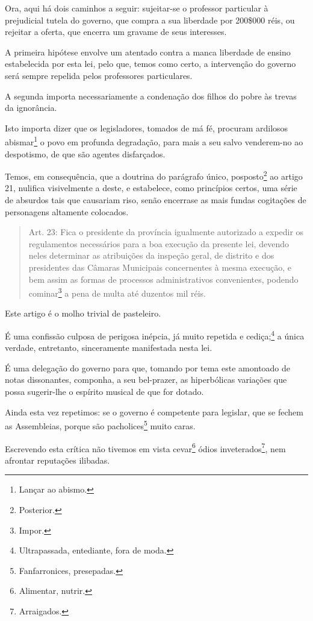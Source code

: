 Ora, aqui há dois caminhos a seguir: sujeitar-se o professor particular
à prejudicial tutela do governo, que compra a sua liberdade por 200\$000
réis, ou rejeitar a oferta, que encerra um gravame de seus interesses.

A primeira hipótese envolve um atentado contra a manca liberdade de
ensino estabelecida por esta lei, pelo que, temos como certo, a
intervenção do governo será sempre repelida pelos professores
particulares.

A segunda importa necessariamente a condenação dos filhos do pobre às
trevas da ignorância.

Isto importa dizer que os legisladores, tomados de má fé, procuram
ardilosos abismar\footnote{Lançar ao abismo.} o povo em profunda
degradação, para mais a seu salvo venderem-no ao despotismo, de que são
agentes disfarçados.

Temos, em consequência, que a doutrina do parágrafo único,
posposto\footnote{Posterior.} ao artigo 21, nulifica visivelmente a
deste, e estabelece, como princípios certos, uma série de absurdos tais
que causariam riso, senão encerrase as mais fundas cogitações de
personagens altamente colocados.

\begin{quote}
Art. 23: Fica o presidente da província igualmente autorizado a expedir
os regulamentos necessários para a boa execução da presente lei, devendo
neles determinar as atribuições da inspeção geral, de distrito e dos
presidentes das Câmaras Municipais concernentes à mesma execução, e bem
assim as formas de processos administrativos convenientes, podendo
cominar\footnote{Impor.} a pena de multa até duzentos mil réis.
\end{quote}

Este artigo é o molho trivial de pasteleiro.

É uma confissão culposa de perigosa inépcia, já muito repetida e
cediça;\footnote{Ultrapassada, entediante, fora de moda.} a única
verdade, entretanto, sinceramente manifestada nesta lei.

É uma delegação do governo para que, tomando por tema este amontoado de
notas dissonantes, componha, a seu bel-prazer, as hiperbólicas variações
que possa sugerir-lhe o espírito musical de que for dotado.

Ainda esta vez repetimos: se o governo é competente para legislar, que
se fechem as Assembleias, porque são pacholices\footnote{
  Fanfarronices, presepadas.} muito caras.

Escrevendo esta crítica não tivemos em vista cevar\footnote{Alimentar,
  nutrir.} ódios inveterados\footnote{Arraigados.}, nem afrontar
reputações ilibadas.

